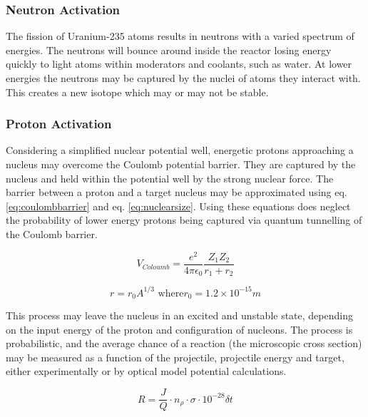 \subsubsection{Neutron Activation}

The fission of Uranium-235 atoms results in neutrons with a varied spectrum of energies.  The neutrons will bounce around inside the reactor losing energy quickly to light atoms within moderators and coolants, such as water.  At lower energies the neutrons may be captured by the nuclei of atoms they interact with.  This creates a new isotope which may or may not be stable.



\subsubsection{Proton Activation}
\label{section:protonactivation}

Considering a simplified nuclear potential well, energetic protons approaching a nucleus may overcome the Coulomb potential barrier.  They are captured by the nucleus and held within the potential well by the strong nuclear force.  The barrier between a proton and a target nucleus may be approximated using eq. \ref{eq:coulombbarrier}\cite{coulombhyperphysics} and eq. \ref{eq:nuclearsize}\cite{nuclearsizehyperphysics}.  Using these equations does neglect the probability of lower energy protons being captured via quantum tunnelling of the Coulomb barrier.

\begin{equation}
V_{Coloumb} = \frac{e^2}{4 \pi \epsilon_{0}} \frac{Z_1 Z_2}{r_{1} + r_{2}}
\label{eq:coulombbarrier}
\end{equation}

\begin{equation}
r = r_{0} A^{1/3} \text{ where} r_0 = 1.2 \times 10^{-15}m
\label{eq:nuclearsize}
\end{equation}

This process may leave the nucleus in an excited and unstable state, depending on the input energy of the proton and configuration of nucleons.  The process is probabilistic, and the average chance of a reaction (the microscopic cross section) may be measured as a function of the projectile, projectile energy and target, either experimentally or by optical model potential calculations.  

\begin{equation}
R = \frac{J}{Q} \cdot n_{\rho} \cdot \sigma \cdot 10^{-28} \delta t
\label{eq:reactioncrosssection}
\end{equation}

